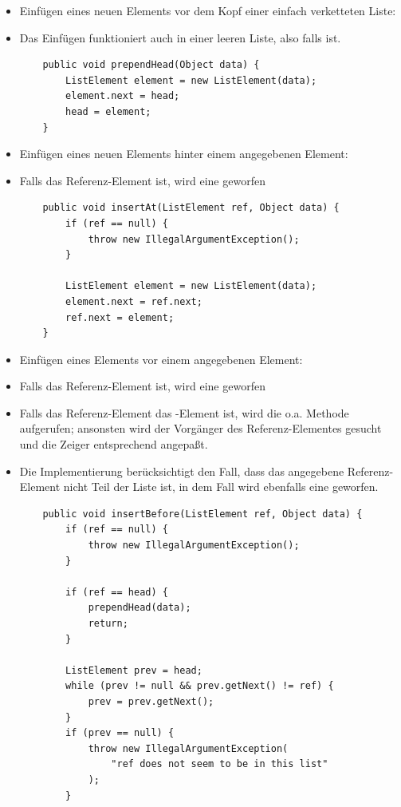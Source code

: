 \begin{itemize}
    \item Einfügen eines neuen Elements vor dem Kopf einer einfach verketteten Liste:
    \item[] Das Einfügen funktioniert auch in einer leeren Liste, also falls  ist.
    \begin{verbatim}
    public void prependHead(Object data) {
        ListElement element = new ListElement(data);
        element.next = head;
        head = element;
    }
    \end{verbatim}
    \item Einfügen eines neuen Elements hinter einem angegebenen Element:
    \item[] Falls das Referenz-Element  ist, wird eine  geworfen
    \begin{verbatim}
    public void insertAt(ListElement ref, Object data) {
        if (ref == null) {
            throw new IllegalArgumentException();
        }

        ListElement element = new ListElement(data);
        element.next = ref.next;
        ref.next = element;
    }
    \end{verbatim}
    \item Einfügen eines Elements vor einem angegebenen Element:
    \item[] Falls das Referenz-Element  ist, wird eine  geworfen
    \item[] Falls das Referenz-Element das -Element ist, wird die o.a. Methode 
    aufgerufen; ansonsten wird der Vorgänger des Referenz-Elementes gesucht und die Zeiger entsprechend angepaßt.
    \item[] Die Implementierung berücksichtigt den Fall, dass das angegebene Referenz-Element nicht Teil der Liste
    ist, in dem Fall wird ebenfalls eine  geworfen.
    \begin{verbatim}
    public void insertBefore(ListElement ref, Object data) {
        if (ref == null) {
            throw new IllegalArgumentException();
        }

        if (ref == head) {
            prependHead(data);
            return;
        }

        ListElement prev = head;
        while (prev != null && prev.getNext() != ref) {
            prev = prev.getNext();
        }
        if (prev == null) {
            throw new IllegalArgumentException(
                "ref does not seem to be in this list"
            );
        }


\end{verbatim}
\end{itemize}
